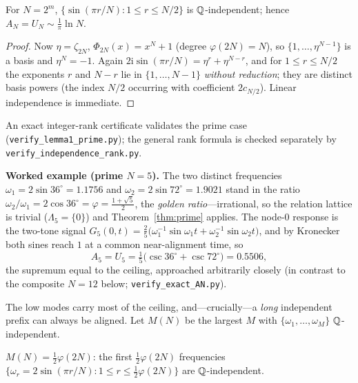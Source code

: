 \begin{theorem}\label{thm:two}
For $N=2^m$, $\{\sin(\pi r/N):1\le r\le N/2\}$ is $\mathbb{Q}$-independent; hence $A_N=U_N\sim\tfrac1\pi\ln N$.
\end{theorem}

\begin{proof}
Now $\eta=\zeta_{2N}$, $\Phi_{2N}(x)=x^{N}+1$ (degree $\varphi(2N)=N$), so $\{1,\dots,\eta^{N-1}\}$ is a
basis and $\eta^{N}=-1$. Again $2\mathrm{i}\sin(\pi r/N)=\eta^r+\eta^{N-r}$, and for $1\le r\le N/2$ the
exponents $r$ and $N-r$ lie in $\{1,\dots,N-1\}$ \emph{without reduction}; they are distinct basis
powers (the index $N/2$ occurring with coefficient $2c_{N/2}$). Linear independence is immediate.
\end{proof}

An exact integer-rank certificate validates the prime case (\texttt{verify\_lemma1\_prime.py}); the
general rank formula is checked separately by \texttt{verify\_independence\_rank.py}.

\medskip\noindent\textbf{Worked example (prime $N=5$).} The two distinct frequencies
$\omega_1=2\sin36^\circ=1.1756$ and $\omega_2=2\sin72^\circ=1.9021$ stand in the ratio
$\omega_2/\omega_1=2\cos36^\circ=\varphi=\tfrac{1+\sqrt5}2$, the \emph{golden ratio}---irrational, so the
relation lattice is trivial ($\Lambda_5=\{0\}$) and Theorem~\ref{thm:prime} applies. The node-$0$ response
is the two-tone signal $G_5(0,t)=\tfrac25\bigl(\omega_1^{-1}\sin\omega_1 t+\omega_2^{-1}\sin\omega_2 t\bigr)$,
and by Kronecker both sines reach $1$ at a common near-alignment time, so
\[
  A_5=U_5=\tfrac15\bigl(\csc36^\circ+\csc72^\circ\bigr)=0.5506,
\]
the supremum equal to the ceiling, approached arbitrarily closely (in contrast to the composite $N=12$ below;
\texttt{verify\_exact\_AN.py}).

The low modes carry most of the ceiling, and---crucially---a \emph{long} independent prefix can always be
aligned. Let $M(N)$ be the largest $M$ with $\{\omega_1,\dots,\omega_M\}$ $\mathbb{Q}$-independent.

\begin{lemma}\label{lem:prefix}
$M(N)=\tfrac12\varphi(2N)$: the first $\tfrac12\varphi(2N)$ frequencies
$\{\omega_r=2\sin(\pi r/N):1\le r\le\tfrac12\varphi(2N)\}$ are $\mathbb{Q}$-independent.
\end{lemma}

